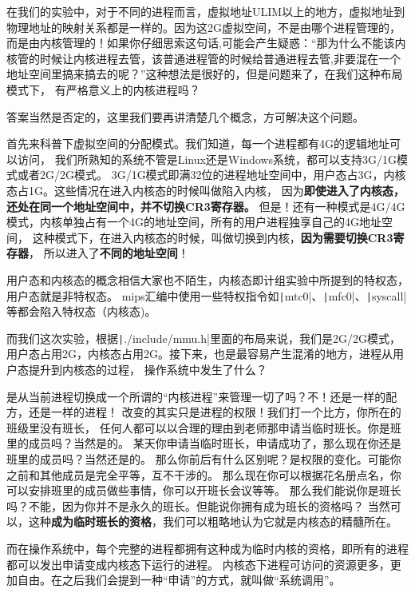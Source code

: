 在我们的实验中，对于不同的进程而言，虚拟地址ULIM以上的地方，虚拟地址到物理地址的映射关系都是一样的。因为这2G虚拟空间，不是由哪个进程管理的，而是由内核管理的！如果你仔细思索这句话,可能会产生疑惑：“那为什么不能该内核管的时候让内核进程去管，该普通进程管的时候给普通进程去管,非要混在一个地址空间里搞来搞去的呢？”这种想法是很好的，但是问题来了，在我们这种布局模式下，
有严格意义上的内核进程吗？

答案当然是否定的，这里我们要再讲清楚几个概念，方可解决这个问题。

首先来科普下虚拟空间的分配模式。我们知道，每一个进程都有4G的逻辑地址可以访问，
我们所熟知的系统不管是Linux还是Windows系统，都可以支持3G/1G模式或者2G/2G模式。
3G/1G模式即满32位的进程地址空间中，用户态占3G，内核态占1G。这些情况在进入内核态的时候叫做陷入内核，
因为\textbf{即使进入了内核态，还处在同一个地址空间中，并不切换CR3寄存器。}
但是！还有一种模式是4G/4G模式，内核单独占有一个4G的地址空间，所有的用户进程独享自己的4G地址空间，
这种模式下，在进入内核态的时候，叫做切换到内核，\textbf{因为需要切换CR3寄存器}，
所以进入了\textbf{不同的地址空间}！

\begin{note}
用户态和内核态的概念相信大家也不陌生，内核态即计组实验中所提到的特权态，用户态就是非特权态。
mips汇编中使用一些特权指令如\texttt|mtc0|、\texttt|mfc0|、\texttt|syscall|等都会陷入特权态（内核态)。
\end{note}

而我们这次实验，根据\texttt|./include/mmu.h|里面的布局来说，我们是2G/2G模式，
用户态占用2G，内核态占用2G。接下来，也是最容易产生混淆的地方，进程从用户态提升到内核态的过程，
操作系统中发生了什么？

是从当前进程切换成一个所谓的“内核进程”来管理一切了吗？不！还是一样的配方，还是一样的进程！
改变的其实只是进程的权限！我们打一个比方，你所在的班级里没有班长，
任何人都可以以合理的理由到老师那申请当临时班长。你是班里的成员吗？当然是的。
某天你申请当临时班长，申请成功了，那么现在你还是班里的成员吗？当然还是的。
那么你前后有什么区别呢？是权限的变化。可能你之前和其他成员是完全平等，互不干涉的。
那么现在你可以根据花名册点名，你可以安排班里的成员做些事情，你可以开班长会议等等。
那么我们能说你是班长吗？不能，因为你并不是永久的班长。但能说你拥有成为班长的资格吗？
当然可以，这种\textbf{成为临时班长的资格}，我们可以粗略地认为它就是内核态的精髓所在。

而在操作系统中，每个完整的进程都拥有这种成为临时内核的资格，即所有的进程都可以发出申请变成内核态下运行的进程。
内核态下进程可访问的资源更多，更加自由。在之后我们会提到一种“申请”的方式，就叫做“系统调用”。

